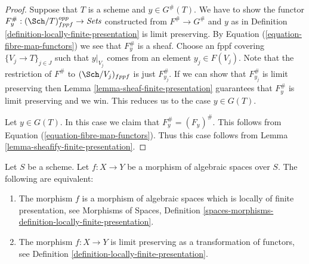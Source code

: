 \begin{proof}
Suppose that $T$ is a scheme and $y \in G^\#(T)$.
We have to show the functor
$F^\#_y : (\Sch/T)_{fppf}^{opp} \to \textit{Sets}$
constructed from $F^\# \to G^\#$ and $y$ as in
Definition \ref{definition-locally-finite-presentation}
is limit preserving.
By Equation (\ref{equation-fibre-map-functors})
we see that $F^\#_y$ is a sheaf. Choose an fppf covering
$\{V_j \to T\}_{j \in J}$ such that $y|_{V_j}$ comes from
an element $y_j \in F(V_j)$.
Note that the restriction of $F^\#$ to $(\Sch/V_j)_{fppf}$
is just $F^\#_{y_j}$. If we can show that $F^\#_{y_j}$ is
limit preserving then
Lemma \ref{lemma-sheaf-finite-presentation}
guarantees that $F^\#_y$ is limit preserving and
we win. This reduces us to the case $y \in G(T)$.

\medskip\noindent
Let $y \in G(T)$. In this case we claim that $F^\#_y = (F_y)^\#$.
This follows from
Equation (\ref{equation-fibre-map-functors}).
Thus this case follows from
Lemma \ref{lemma-sheafify-finite-presentation}.
\end{proof}

\begin{proposition}
\label{proposition-characterize-locally-finite-presentation}
Let $S$ be a scheme. Let $f : X \to Y$ be a morphism of algebraic
spaces over $S$. The following are equivalent:
\begin{enumerate}
\item The morphism $f$ is a morphism of algebraic spaces which is
locally of finite presentation, see
Morphisms of Spaces,
Definition \ref{spaces-morphisms-definition-locally-finite-presentation}.
\item The morphism $f : X \to Y$ is limit preserving as
a transformation of functors, see
Definition \ref{definition-locally-finite-presentation}.
\end{enumerate}
\end{proposition}

